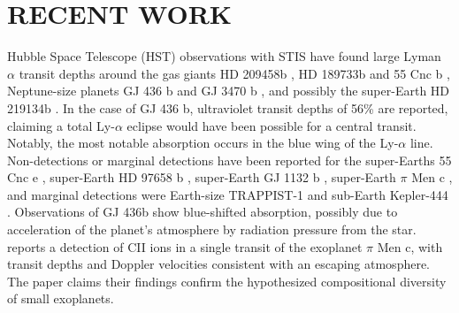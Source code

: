 \documentclass[onecolumn]{aastex63}
\begin{document}
\section{RECENT WORK}

Hubble Space Telescope (HST) observations with STIS have found large Lyman $\alpha$ transit depths around the gas giants HD 209458b \citep{2003Natur.422..143V}, HD 189733b \citep{2012A&A...543L...4L} and 55 Cnc b \citep{2012A&A...547A..18E}, Neptune-size planets GJ 436 b 
\citep{2015Natur.522..459E}
and GJ 3470 b \citep{2018A&A...620A.147B}, and possibly the super-Earth HD 219134b \citep{2019EPSC...13.1928L}. In the case of GJ 436 b, ultraviolet transit depths of 56\% are reported, claiming a total Ly-$\alpha$ eclipse would have been possible for a central transit. Notably, the most notable absorption occurs in the blue wing of the Ly-$\alpha$ line. Non-detections or marginal detections have been reported for the super-Earths 55 Cnc e \citep{2012A&A...547A..18E}, super-Earth HD 97658 b \citep{2017A&A...597A..26B} , super-Earth GJ 1132 b \citep{2019AJ....158...50W}, super-Earth $\pi$ Men c \citep{2020ApJ...888L..21G}, and marginal detections were Earth-size TRAPPIST-1 \citep{2017A&A...599L...3B} and sub-Earth Kepler-444 \citep{2017A&A...602A.106B}. Observations of GJ 436b show blue-shifted absorption, possibly due to acceleration of the planet’s atmosphere by radiation pressure from the star. \cite{2021ApJ...907L..36M} reports a detection of CII ions in a single transit of the exoplanet $\pi$ Men c, with transit depths and Doppler velocities consistent with an escaping atmosphere. The paper claims their findings confirm the hypothesized compositional diversity of small exoplanets. 
\end{document}
